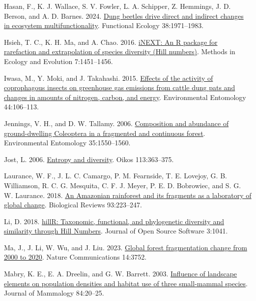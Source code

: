 \documentclass[
  man, donotrepeattitle]{apa6}
\newlength{\cslhangindent}
\newenvironment{CSLReferences}[2] %
 {\begin{list}{}{%
  \setlength{\itemindent}{0pt}
  \setlength{\leftmargin}{0pt}
  \setlength{\parsep}{0pt}
  \ifodd #1
   \setlength{\leftmargin}{\cslhangindent}
   \setlength{\itemindent}{-1\cslhangindent}
  \fi
  \setlength{\itemsep}{#2\baselineskip}}}
 {\end{list}}
\begin{document}
\begin{CSLReferences}{1}{0}
Hasan, F., K. J. Wallace, S. V. Fowler, L. A. Schipper, Z. Hemmings, J. D. Berson, and A. D. Barnes. 2024. \href{https://doi.org/10.1111/1365-2435.14607}{Dung beetles drive direct and indirect changes in ecosystem multifunctionality}. Functional Ecology 38:1971--1983.

Hsieh, T. C., K. H. Ma, and A. Chao. 2016. \href{https://doi.org/10.1111/2041-210X.12613}{{iNEXT}: An {R} package for rarefaction and extrapolation of species diversity ({Hill} numbers)}. Methods in Ecology and Evolution 7:1451--1456.

Iwasa, M., Y. Moki, and J. Takahashi. 2015. \href{https://doi.org/10.1093/ee/nvu023}{Effects of the activity of coprophagous insects on greenhouse gas emissions from cattle dung pats and changes in amounts of nitrogen, carbon, and energy}. Environmental Entomology 44:106--113.

Jennings, V. H., and D. W. Tallamy. 2006. \href{https://doi.org/10.1093/ee/35.6.1550}{Composition and abundance of ground-dwelling {Coleoptera} in a fragmented and continuous forest}. Environmental Entomology 35:1550--1560.

Jost, L. 2006. \href{https://doi.org/10.1111/j.2006.0030-1299.14714.x}{Entropy and diversity}. Oikos 113:363--375.

Laurance, W. F., J. L. C. Camargo, P. M. Fearnside, T. E. Lovejoy, G. B. Williamson, R. C. G. Mesquita, C. F. J. Meyer, P. E. D. Bobrowiec, and S. G. W. Laurance. 2018. \href{https://doi.org/10.1111/brv.12343}{An {Amazonian} rainforest and its fragments as a laboratory of global change}. Biological Reviews 93:223--247.

Li, D. 2018. \href{https://doi.org/10.21105/joss.01041}{{hillR}: Taxonomic, functional, and phylogenetic diversity and similarity through {Hill} {Numbers}}. Journal of Open Source Software 3:1041.

Ma, J., J. Li, W. Wu, and J. Liu. 2023. \href{https://doi.org/10.1038/s41467-023-39221-x}{Global forest fragmentation change from 2000 to 2020}. Nature Communications 14:3752.

Mabry, K. E., E. A. Dreelin, and G. W. Barrett. 2003. \href{https://www.jstor.org/stable/1383631}{Influence of landscape elements on population densities and habitat use of three small-mammal species}. Journal of Mammalogy 84:20--25.


\end{CSLReferences}
\end{document}
